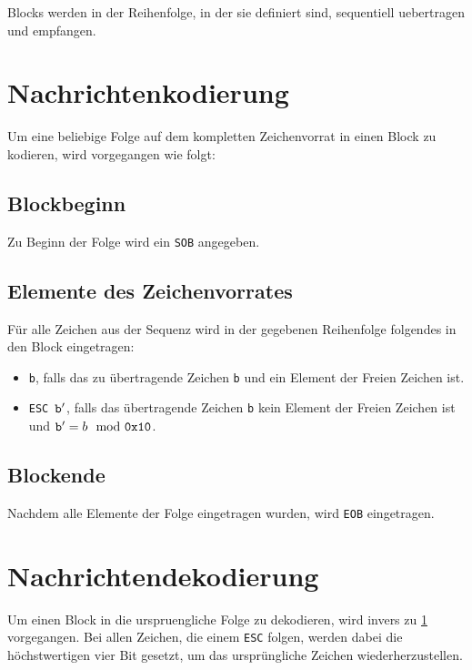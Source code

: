 Blocks werden in der Reihenfolge, in der sie definiert sind, sequentiell uebertragen und
empfangen.

\section{Nachrichtenkodierung}\label{j-lsp-encoding}
Um eine beliebige Folge auf dem kompletten Zeichenvorrat in einen Block
zu kodieren, wird vorgegangen wie folgt:

\subsection{Blockbeginn}
Zu Beginn der  Folge wird ein {\tt SOB} angegeben.

\subsection{Elemente des Zeichenvorrates}
F\"ur alle Zeichen aus der Sequenz wird in der gegebenen Reihenfolge folgendes
in den Block eingetragen:
\begin{itemize}
  \item{{\tt b}, falls das zu \"ubertragende Zeichen {\tt b} und ein Element der
    Freien Zeichen ist.}
  \item{{\tt ESC $\text{\tt b}^\prime$}, falls das \"ubertragende Zeichen {\tt b} kein
    Element der Freien Zeichen ist und $\text{\tt b}^\prime = b \mod \text{\tt 0x10}$.
  }
\end{itemize}

\subsection{Blockende}
Nachdem alle Elemente der Folge eingetragen wurden, wird {\tt EOB} eingetragen.


\section{Nachrichtendekodierung}
Um einen Block in die urspruengliche Folge zu dekodieren, wird invers zu \ref{j-lsp-encoding}
vorgegangen. Bei allen Zeichen, die einem {\tt ESC} folgen, werden dabei die h\"ochstwertigen
vier Bit gesetzt, um das urspr\"ungliche Zeichen wiederherzustellen.

